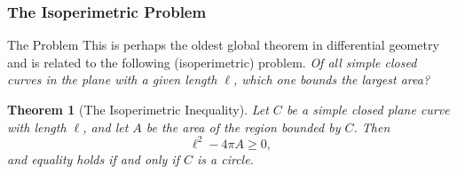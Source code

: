 \documentclass{beamer}
\newtheorem{thm}{Theorem}
\theoremstyle{definition}
\theoremstyle{remark}
\renewcommand{\=}{&=&}
\newcommand{\<}{\langle}
\renewcommand{\>}{\rangle}
\begin{document}
\begin{frame}[t]
\frametitle{The Isoperimetric Problem}
\begin{block}{The Problem}
This is perhaps the oldest global theorem in differential geometry and is related to the following
(isoperimetric) problem. \emph{Of all simple closed curves in the plane with a given length $\ell$,
which one bounds the largest area?}
\end{block}
\pause
\begin{thm}[The Isoperimetric Inequality]
Let $C$ be a simple closed plane curve with length $\ell$, and let $A$ be the area of the region
bounded by $C$. Then
\[ \ell^2 - 4 \pi A \ge 0, \]
and equality holds if and only if $C$ is a circle.
\end{thm}
\end{frame}
\end{document}

